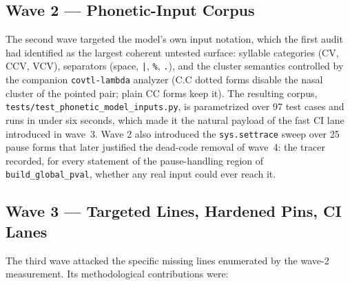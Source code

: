 \documentclass[11pt,a4paper]{article}
\newcommand{\code}[1]{\texttt{#1}}
\newcommand{\pkg}[1]{\texttt{#1}}
\begin{document}
\subsection{Wave 2 --- Phonetic-Input Corpus}
\label{sec:wave2}

The second wave targeted the model's own input notation, which the
first audit had identified as the largest coherent untested surface:
syllable categories (CV, CCV, VCV), separators (space, \code{|},
\code{\%}, \code{.}), and the cluster semantics controlled by the
companion \pkg{covtl-lambda} analyzer (C.C dotted forms disable the
nasal cluster of the pointed pair; plain CC forms keep it). The
resulting corpus, \code{tests/test\_phonetic\_model\_inputs.py}, is
parametrized over 97 test cases and runs in under six seconds, which
made it the natural payload of the fast CI lane introduced in wave~3.
Wave 2 also introduced the \code{sys.settrace} sweep over 25 pause
forms that later justified the dead-code removal of wave~4: the tracer
recorded, for every statement of the pause-handling region of
\code{build\_global\_pval}, whether any real input could ever reach it.

\subsection{Wave 3 --- Targeted Lines, Hardened Pins, CI Lanes}
\label{sec:wave3}

The third wave attacked the specific missing lines enumerated by the
wave-2 measurement. Its methodological contributions were:
\end{document}
